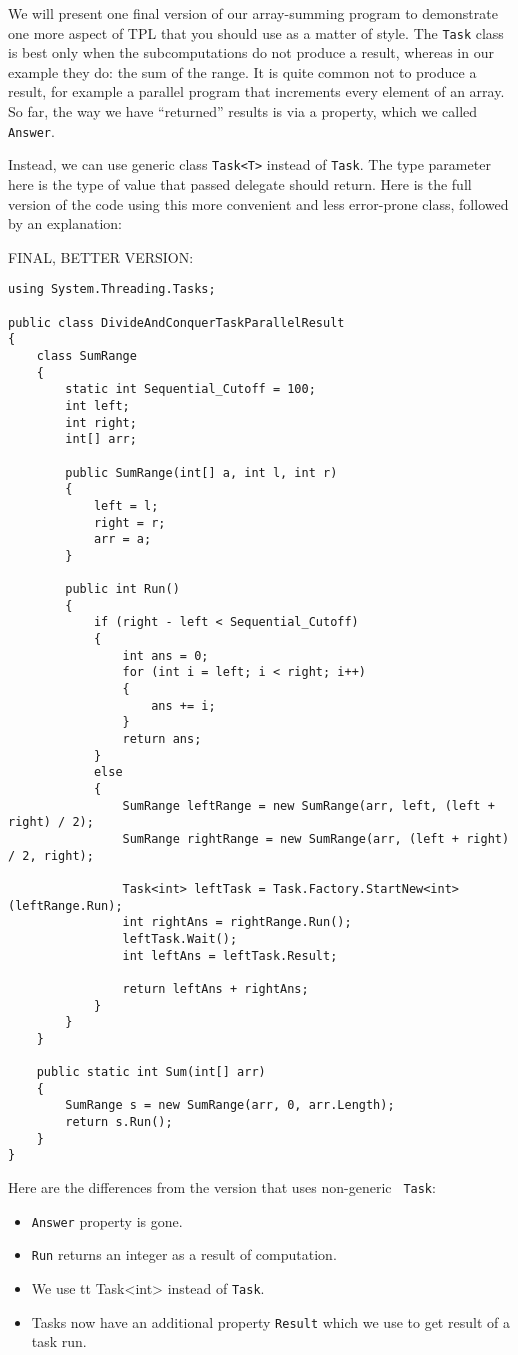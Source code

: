 \documentclass[10pt]{article}
\begin{document}
We will present one final version of our array-summing program to demonstrate 
one more aspect of TPL that you should use as a matter of style. The {\tt Task} 
class is best only when the subcomputations do not produce a result, whereas 
in our example they do: the sum of the range. It is quite common not to produce 
a result, for example a parallel program that increments every element of an 
array. So far, the way we have “returned” results is via a property, 
which we called {\tt Answer}.

Instead, we can use generic class {\tt Task<T>} instead of {\tt Task}. The type 
parameter here is the type of value that passed delegate should return. 
Here is the full version of the code using this more convenient and less 
error-prone class, followed by an explanation:

\medskip
\noindent FINAL, BETTER VERSION:

\begin{verbatim}
using System.Threading.Tasks;

public class DivideAndConquerTaskParallelResult
{
    class SumRange
    {
        static int Sequential_Cutoff = 100;
        int left;
        int right;
        int[] arr;

        public SumRange(int[] a, int l, int r)
        {
            left = l;
            right = r;
            arr = a;
        }

        public int Run()
        {
            if (right - left < Sequential_Cutoff)
            {
                int ans = 0;
                for (int i = left; i < right; i++)
                {
                    ans += i;
                }
                return ans;
            }
            else
            {
                SumRange leftRange = new SumRange(arr, left, (left + right) / 2);
                SumRange rightRange = new SumRange(arr, (left + right) / 2, right);

                Task<int> leftTask = Task.Factory.StartNew<int>(leftRange.Run);
                int rightAns = rightRange.Run();
                leftTask.Wait();
                int leftAns = leftTask.Result;

                return leftAns + rightAns;
            }
        }
    }

    public static int Sum(int[] arr)
    {
        SumRange s = new SumRange(arr, 0, arr.Length);
        return s.Run();
    }
}
\end{verbatim}

Here are the differences from the version that uses non-generic {\tt
  Task}:
\begin{itemize}
\item {\tt Answer} property is gone.
\item {\tt Run} returns an integer as a result of computation.
\item We use {tt Task<int>} instead of {\tt Task}.
\item Tasks now have an additional property {\tt Result} which we 
 use to get result of a task run.
\end{itemize}
\end{document}
